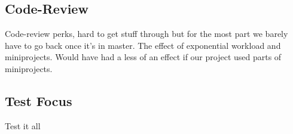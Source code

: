 \subsection{Code-Review}
Code-review perks, hard to get stuff through but for the most part we barely have to go back once it's in master.
The effect of exponential workload and miniprojects.
Would have had a less of an effect if our project used parts of miniprojects.
\subsection{Test Focus}
Test it all
\subsection{}
